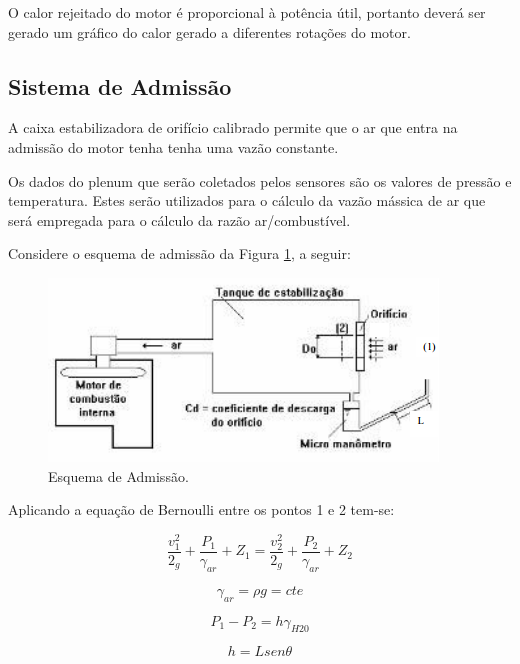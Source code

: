 O calor rejeitado do motor é proporcional à potência útil, portanto deverá ser gerado um gráfico do calor gerado a diferentes rotações do motor.

\subsection{Sistema de Admissão}

A caixa estabilizadora de orifício calibrado permite que o ar que entra na admissão do motor tenha tenha uma vazão constante.

Os dados do plenum que serão coletados pelos sensores são os valores de pressão e temperatura. Estes serão utilizados para o cálculo da vazão mássica de ar que será empregada para o cálculo da razão ar/combustível.

Considere o esquema de admissão da Figura \ref{esquema-de-admissao}, a seguir:

\begin{figure}[h!]
	\centering
	\includegraphics[keepaspectratio=true,scale= 0.8]{figuras/esquema-de-admissao.png}
	\caption{Esquema de Admissão.}
	\label{esquema-de-admissao}
\end{figure}

Aplicando a equação de Bernoulli entre os pontos 1 e 2 tem-se:

\begin{equation}
	\frac{v_{1}^{2}}{2_{g}} + \frac{P_{1}}{\gamma _{ar}} + Z_{1} = \frac{v_{2}^{2}}{2_{g}} + \frac{P_{2}}{\gamma _{ar}} + Z_{2}
\end{equation}

\begin{equation}
	\gamma _{ar} = \rho g = cte
\end{equation}

\begin{equation}
	P_{1} - P_{2} = h\gamma _{H20}
\end{equation}

\begin{equation}
	h = Lsen\theta
\end{equation}

